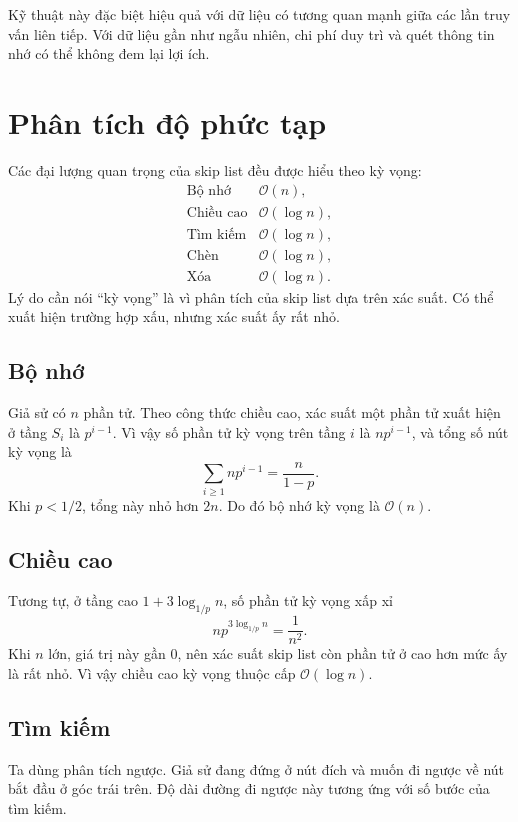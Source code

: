 \documentclass[11pt]{article}
\newcommand{\Oh}{\mathcal{O}}
\begin{document}
Kỹ thuật này đặc biệt hiệu quả với dữ liệu có tương quan mạnh giữa các lần
truy vấn liên tiếp. Với dữ liệu gần như ngẫu nhiên, chi phí duy trì và quét
thông tin nhớ có thể không đem lại lợi ích.

\section{Phân tích độ phức tạp}

Các đại lượng quan trọng của skip list đều được hiểu theo kỳ vọng:
\[
\begin{array}{ll}
\text{Bộ nhớ} & \Oh(n),\\
\text{Chiều cao} & \Oh(\log n),\\
\text{Tìm kiếm} & \Oh(\log n),\\
\text{Chèn} & \Oh(\log n),\\
\text{Xóa} & \Oh(\log n).
\end{array}
\]
Lý do cần nói ``kỳ vọng'' là vì phân tích của skip list dựa trên xác suất. Có
thể xuất hiện trường hợp xấu, nhưng xác suất ấy rất nhỏ.

\subsection{Bộ nhớ}

Giả sử có \(n\) phần tử. Theo công thức chiều cao, xác suất một phần tử xuất
hiện ở tầng \(S_i\) là \(p^{i-1}\). Vì vậy số phần tử kỳ vọng trên tầng \(i\)
là \(n p^{i-1}\), và tổng số nút kỳ vọng là
\[
  \sum_{i\ge 1} n p^{i-1}=\frac{n}{1-p}.
\]
Khi \(p<1/2\), tổng này nhỏ hơn \(2n\). Do đó bộ nhớ kỳ vọng là \(\Oh(n)\).

\subsection{Chiều cao}

Tương tự, ở tầng cao \(1+3\log_{1/p} n\), số phần tử kỳ vọng xấp xỉ
\[
  n p^{3\log_{1/p}n}=\frac{1}{n^2}.
\]
Khi \(n\) lớn, giá trị này gần \(0\), nên xác suất skip list còn phần tử ở cao
hơn mức ấy là rất nhỏ. Vì vậy chiều cao kỳ vọng thuộc cấp \(\Oh(\log n)\).

\subsection{Tìm kiếm}

Ta dùng phân tích ngược. Giả sử đang đứng ở nút đích và muốn đi ngược về nút
bắt đầu ở góc trái trên. Độ dài đường đi ngược này tương ứng với số bước của
tìm kiếm.
\end{document}
